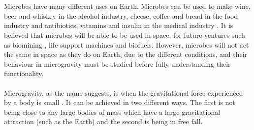 \documentclass[12pt]{article}
\begin{document}
\\
\\Microbes have many different uses on Earth. Microbes can be used to make wine, beer and whiskey in the alcohol industry, cheese, coffee and bread in the food industry and antibiotics, vitamins and insulin in the medical industry . It is believed that microbes will be able to be used in space, for future ventures such as biomining , life support machines  and biofuels.  However, microbes will not act the same in space as they do on Earth, due to the different conditions, and their behaviour in microgravity must be studied before fully understanding their functionality. 
\\
\\Microgravity, as the name suggests, is when the gravitational force experienced by a body is small . It can be achieved in two different ways. The first is not being close to any large bodies of mass which have a large gravitational attraction (such as the Earth) and the second is being in free fall. 
\end{document}
